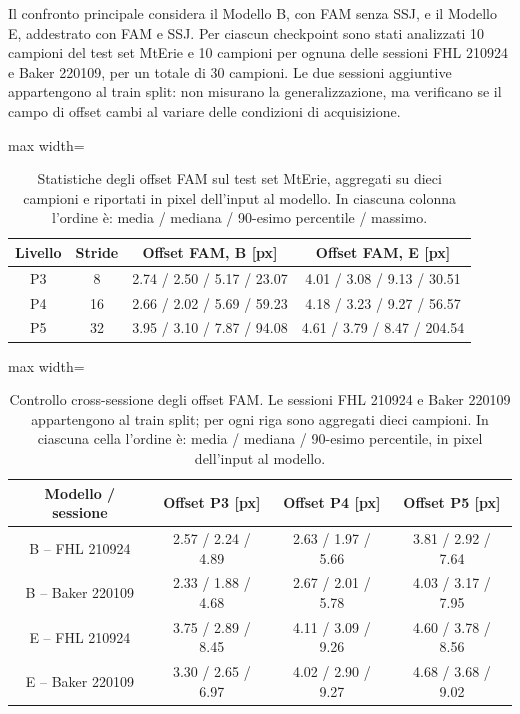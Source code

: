\documentclass[a4paper,11pt]{article}
\begin{document}
Il confronto principale considera il Modello B, con FAM senza SSJ, e il Modello E, addestrato con FAM e SSJ. Per ciascun checkpoint sono stati analizzati 10 campioni del test set MtErie e 10 campioni per ognuna delle sessioni FHL 210924 e Baker 220109, per un totale di 30 campioni. Le due sessioni aggiuntive appartengono al train split: non misurano la generalizzazione, ma verificano se il campo di offset cambi al variare delle condizioni di acquisizione.

\begin{table}[H]
\centering
\caption{Statistiche degli offset FAM sul test set MtErie, aggregati su dieci campioni e riportati in pixel dell'input al modello. In ciascuna colonna l'ordine è: media / mediana / 90-esimo percentile / massimo.}
\label{tab:fam_alignment_offsets}
\begin{adjustbox}{max width=\textwidth}
\begin{tabular}{cccc}
\toprule
\textbf{Livello} & \textbf{Stride} & \textbf{Offset FAM, B [px]} & \textbf{Offset FAM, E [px]} \\
\midrule
P3 & 8  & 2.74 / 2.50 / 5.17 / 23.07 & 4.01 / 3.08 / 9.13 / 30.51 \\
P4 & 16 & 2.66 / 2.02 / 5.69 / 59.23 & 4.18 / 3.23 / 9.27 / 56.57 \\
P5 & 32 & 3.95 / 3.10 / 7.87 / 94.08 & 4.61 / 3.79 / 8.47 / 204.54 \\
\bottomrule
\end{tabular}
\end{adjustbox}
\end{table}

\begin{table}[H]
\centering
\caption{Controllo cross-sessione degli offset FAM. Le sessioni FHL 210924 e Baker 220109 appartengono al train split; per ogni riga sono aggregati dieci campioni. In ciascuna cella l'ordine è: media / mediana / 90-esimo percentile, in pixel dell'input al modello.}
\label{tab:fam_alignment_cross_session}
\begin{adjustbox}{max width=\textwidth}
\begin{tabular}{cccc}
\toprule
\textbf{Modello / sessione} & \textbf{Offset P3 [px]} & \textbf{Offset P4 [px]} & \textbf{Offset P5 [px]} \\
\midrule
B -- FHL 210924   & 2.57 / 2.24 / 4.89 & 2.63 / 1.97 / 5.66 & 3.81 / 2.92 / 7.64 \\
B -- Baker 220109 & 2.33 / 1.88 / 4.68 & 2.67 / 2.01 / 5.78 & 4.03 / 3.17 / 7.95 \\
E -- FHL 210924   & 3.75 / 2.89 / 8.45 & 4.11 / 3.09 / 9.26 & 4.60 / 3.78 / 8.56 \\
E -- Baker 220109 & 3.30 / 2.65 / 6.97 & 4.02 / 2.90 / 9.27 & 4.68 / 3.68 / 9.02 \\
\bottomrule
\end{tabular}
\end{adjustbox}
\end{table}
\end{document}
